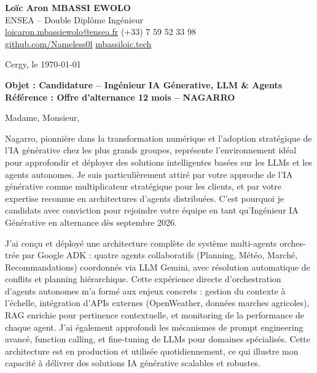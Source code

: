 \documentclass[a4paper,11pt]{article}
\begin{document}
\noindent
\textbf{Lo\"ic Aron MBASSI EWOLO} \\
ENSEA -- Double Dipl\^ome Ing\'enieur \\
\href{mailto:loicaron.mbassiewolo@ensea.fr}{loicaron.mbassiewolo@ensea.fr} \quad (+33) 7 59 52 33 98 \\
\href{https://github.com/Nameless0l}{github.com/Nameless0l} \quad \href{https://mbassiloic.tech}{mbassiloic.tech}

\vspace{1em}
\noindent
Cergy, le \today

\vspace{1em}
\noindent
\textbf{Objet : Candidature -- Ing\'enieur IA G\'enerative, LLM \& Agents} \\
\textbf{R\'ef\'erence : Offre d'alternance 12 mois -- NAGARRO}

\vspace{1.5em}
\noindent Madame, Monsieur,

\vspace{0.8em}
\noindent Nagarro, pionnière dans la transformation numérique et l'adoption stratégique de l'IA générative chez les plus grands groupes, représente l'environnement idéal pour approfondir et déployer des solutions intelligentes basées sur les LLMs et les agents autonomes. Je suis particulièrement attiré par votre approche de l'IA générative comme multiplicateur stratégique pour les clients, et par votre expertise reconnue en architectures d'agents distribuées. C'est pourquoi je candidats avec conviction pour rejoindre votre équipe en tant qu'Ingénieur IA Générative en alternance dès septembre 2026.

\vspace{0.8em}
\noindent J'ai conçu et déployé une architecture complète de système multi-agents orches-trée par Google ADK : quatre agents collaboratifs (Planning, Météo, Marché, Recommandations) coordonnés via LLM Gemini, avec résolution automatique de conflits et planning hiérarchique. Cette expérience directe d'orchestration d'agents autonomes m'a formé aux enjeux concrets : gestion du contexte à l'échelle, intégration d'APIs externes (OpenWeather, données marches agricoles), RAG enrichie pour pertinence contextuelle, et monitoring de la performance de chaque agent. J'ai également approfondi les mécanismes de prompt engineering avancé, function calling, et fine-tuning de LLMs pour domaines spécialisés. Cette architecture est en production et utilisée quotidiennement, ce qui illustre mon capacité à délivrer des solutions IA générative scalables et robustes.
\end{document}
